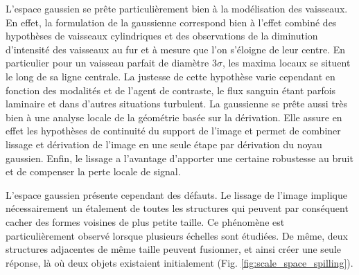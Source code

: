   L'espace gaussien se prête particulièrement bien à la modélisation des vaisseaux. En effet, la formulation de la gaussienne correspond bien à l'effet combiné des hypothèses de vaisseaux cylindriques et des observations de la diminution d'intensité des vaisseaux au fur et à mesure que l'on s'éloigne de leur centre. En particulier pour un vaisseau parfait de diamètre $3\sigma$, les maxima locaux se situent le long de sa ligne centrale. La justesse de cette hypothèse varie cependant en fonction des modalités et de l'agent de contraste, le flux sanguin étant parfois laminaire et dans d'autres situations turbulent. La gaussienne se prête aussi très bien à une analyse locale de la géométrie basée sur la dérivation. Elle assure en effet les hypothèses de continuité du support de l'image et permet de combiner lissage et dérivation de l'image en une seule étape par dérivation du noyau gaussien. Enfin, le lissage a l'avantage d'apporter une certaine robustesse au bruit et de compenser la perte locale de signal.

  L'espace gaussien présente cependant des défauts. Le lissage de l'image implique nécessairement un étalement de toutes les structures qui peuvent par conséquent cacher des formes voisines de plus petite taille. Ce phénomène est particulièrement observé lorsque plusieurs échelles sont étudiées. De même, deux structures adjacentes de même taille peuvent fusionner, et ainsi créer une seule réponse, là où deux objets existaient initialement (Fig. \ref{fig:scale_space_spilling}).
  
